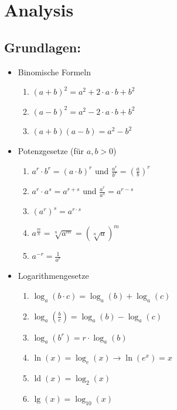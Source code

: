 \section{Analysis}
\subsection{Grundlagen:}
\begin{itemize}
\item Binomische Formeln\\
\begin{enumerate}
\item $(a+b)^2 = a^2+2\cdot a\cdot b + b^2$\\
\item $(a-b)^2 = a^2 -2\cdot a\cdot b + b^2$\\
\item $(a+b)(a-b) = a^2 - b^2$
\end{enumerate}
\item Potenzgesetze (für $a, b > 0$)\\
\begin{enumerate}
\item $a^r \cdot b^r = (a\cdot b)^r$ und $\frac{a^r}{b^r} = \left(\frac{a}{b}\right)^r$\\
\item $a^r \cdot a^s = a^{r+s}$ und $ \frac{a^r}{a^s} = a^{r-s}$\\
\item $(a^r)^s = a^{r\cdot s}$\\
\item $a^{\frac{m}{n}} = \sqrt[n]{a^m} = (\sqrt[n]{a})^m$\\
\item $a^{-r} = \frac{1}{a^r}$
\end{enumerate}
\item Logarithmengesetze\\
\begin{enumerate}
\item $\log_a(b\cdot c) = \log_a(b) + \log_a(c)$\\
\item $\log_a(\frac{b}{c}) = \log_a(b) - \log_a(c)$\\
\item $\log_a(b^r) = r\cdot \log_a(b)$\\
\item $\ln(x) = \log_e(x) \longrightarrow \ln(e^x) =x $\\
\item $\operatorname{ld}(x) = \log_2(x)$\\
\item $\operatorname{lg}(x) = \log_{10}(x)$
\end{enumerate}
\end{itemize}
